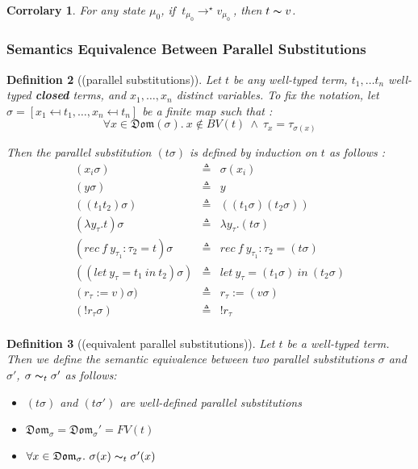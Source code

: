 \documentclass[a4paper,11pt,oneside]{article}
\theoremstyle{plain}
\newtheorem{definition}{Definition}[subsection]
\newtheorem{corr}[definition]{Corrolary}
\newcommand{\bwedge}{\boldsymbol{~\wedge~}}
\newcommand{\evalstar}[4]{~#1_{\mu_#2} \rightarrow^{\star} #3_{\mu_#4} ~}
\begin{document}
	\begin{corr} 
		For any state $\mu_0$, if $\evalstar{{t}}{0}{{v}}{0}$, then		
		$t \thicksim v$.
	\end{corr}
\subsubsection*{Semantics Equivalence Between Parallel Substitutions}

  



	\begin{definition}[(parallel substitutions)]
	Let $t$ be any well-typed term, $t_1, \dots t_n$ well-typed 
	\textit{\textbf{closed}} terms, and $x_1, \dots, x_n$ distinct variables.
	To fix the notation, 
	let $\sigma = [x_1 \mapsfrom t_1, \dots, x_n \mapsfrom t_n] $ be
	a finite map such that :  	
	$$\forall x\in\mathfrak{Dom}(\sigma).~x\notin BV(t)\bwedge\tau_x=
	\tau_{\sigma(x)}$$

	Then the parallel substitution $(t\sigma)$ is defined by induction on $t$ 
	as follows :
	\begin{displaymath}
	\begin{array}{lll}
	 (x_i\sigma)& \triangleq & \sigma(x_i)\\
	 (y\sigma)& \triangleq & y \\
	 ((t_1t_2)\sigma) & \triangleq & ((t_1\sigma)(t_2\sigma))\\
	 (\lambda y_{\tau}. t)\sigma & \triangleq & \lambda y_\tau. (t\sigma)\\
	 (rec~f~y_{\tau_1} : \tau_2 = t)\sigma & \triangleq 
	   & rec~f~y_{\tau_1} : \tau_2 = (t\sigma) \\
	 ((let~y_\tau = t_1~ in~ t_2)\sigma) & \triangleq 
	   & let~y_\tau = (t_1\sigma)~in~ (t_2\sigma)\\
	  (r_\tau := v)\sigma)	& \triangleq & r_\tau := (v\sigma) \\
	 (!r_\tau\sigma) & \triangleq & !r_\tau \\
	     	 
	\end{array}
	\end{displaymath}
	\label{}
	\end{definition}

	\begin{definition}[(equivalent parallel substitutions)]
	Let $t$ be a well-typed term. Then we define the semantic equivalence
	between two parallel substitutions $\sigma$ and $\sigma'$, 
	$\sigma \thicksim_t \sigma'$ as follows:
	\begin{itemize}
	\item[(1)] 
	  $(t\sigma)$ and $(t\sigma')$ are well-defined parallel substitutions
	\item[(2)]
	  $ \mathfrak{Dom}_\sigma = \mathfrak{Dom}_\sigma' = FV(t)$
	\item[(3)]
		$ \forall x \in \mathfrak{Dom}_\sigma.~ \sigma(x) \thicksim_t \sigma'(x)$
	\end{itemize}	 
	\label{equiv-subst-d}
	\end{definition}
\end{document}
